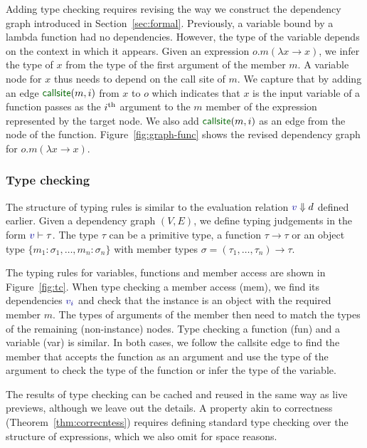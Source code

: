 \documentclass[english,submission]{programming}
\theoremstyle{plain}
\theoremstyle{definition}
\newcommand{\bndclr}[1]{\textcolor{kvdclr}{#1}}
\newcommand{\blbl}[1]{\textnormal{\textcolor{numclr}{\sffamily #1}}}
\newcommand{\rname}[1]{{\sffamily(#1)}}
\begin{document}
Adding type checking requires revising the way we construct the dependency graph introduced in
Section~\ref{sec:formal}. Previously, a variable bound by a lambda function had no dependencies.
However, the type of the variable depends on the context in which it appears. Given an expression
$o.m(\lambda x\rightarrow x)$, we infer the type of $x$ from the type of the first argument
of the member $m$. A variable node for $x$ thus needs to depend on the call site of $m$.
We capture that by adding an edge $\blbl{callsite}(m, i)$ from $x$ to $o$ which indicates that
$x$ is the input variable of a function passes as the $i^\textnormal{th}$ argument to the $m$
member of the expression represented by the target node. We also add $\blbl{callsite}(m, i)$
as an edge from the node of the function. Figure~\ref{fig:graph-func} shows the
revised dependency graph for $o.m(\lambda x\rightarrow x)$. %

\subsubsection{Type checking}
The structure of typing rules is similar to the evaluation relation $\bndclr{v}\Downarrow d$
defined earlier. Given a dependency graph $(V, E)$, we define typing judgements in the form
$\bndclr{v}\vdash \tau$. The type $\tau$ can be a primitive type, a function $\tau \rightarrow \tau$
or an object type $\{m_1\!:\!\sigma_1, \ldots, m_n\!:\!\sigma_n\}$ with member types
$\sigma = (\tau_1, \ldots, \tau_n) \rightarrow \tau$.

The typing rules for variables, functions and member access are shown in Figure~\ref{fig:tc}.
When type checking a member access \rname{mem}, we find its dependencies $\bndclr{v_i}$ and
check that the instance is an object with the required member $m$. The types of arguments of the
member then need to match the types of the remaining (non-instance) nodes.
Type checking a function \rname{fun} and a variable \rname{var} is similar. In both cases,
we follow the \blbl{callsite} edge to find the member that accepts the function as an argument
and use the type of the argument to check the type of the function or infer the type of the
variable.

The results of type checking can be cached and reused in the same way as live previews, although
we leave out the details. A property akin to correctness (Theorem~\ref{thm:correcntess})
requires defining standard type checking over the structure of expressions, which we also
omit for space reasons.
\end{document}
